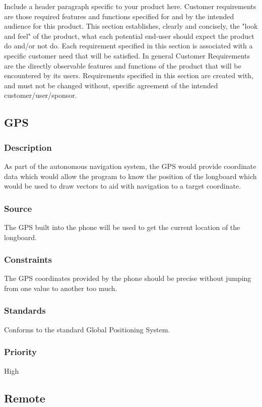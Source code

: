 Include a header paragraph specific to your product here. Customer requirements are those required features and functions specified for and by the intended audience for this product. This section establishes, clearly and concisely, the "look and feel" of the product, what each potential end-user should expect the product do and/or not do. Each requirement specified in this section is associated with a specific customer need that will be satisfied. In general Customer Requirements are the directly observable features and functions of the product that will be encountered by its users. Requirements specified in this section are created with, and must not be changed without, specific agreement of the intended customer/user/sponsor.

\subsection{GPS}
\subsubsection{Description}
As part of the autonomous navigation system, the GPS would provide coordinate data which would allow the program to know the position of the longboard which would be used to draw vectors to aid with navigation to a target coordinate.
\subsubsection{Source}
The GPS built into the phone will be used to get the current location of the longboard.
\subsubsection{Constraints}
The GPS coordinates provided by the phone should be precise without jumping from one value to another too much.
\subsubsection{Standards}
Conforms to the standard Global Positioning System.
\subsubsection{Priority}
High

\subsection{Remote}
